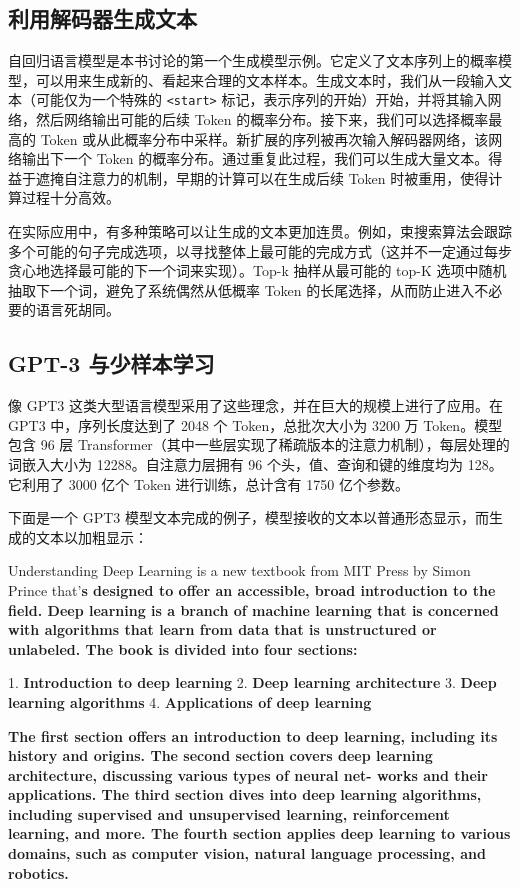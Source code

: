 \documentclass[lang=cn,newtx,10pt,scheme=chinese]{elegantbook}
\begin{document}
\subsection{利用解码器生成文本}
自回归语言模型是本书讨论的第一个生成模型示例。它定义了文本序列上的概率模型，可以用来生成新的、看起来合理的文本样本。生成文本时，我们从一段输入文本（可能仅为一个特殊的 \texttt{\textless start\textgreater} 标记，表示序列的开始）开始，并将其输入网络，然后网络输出可能的后续 Token 的概率分布。接下来，我们可以选择概率最高的 Token 或从此概率分布中采样。新扩展的序列被再次输入解码器网络，该网络输出下一个 Token 的概率分布。通过重复此过程，我们可以生成大量文本。得益于遮掩自注意力的机制，早期的计算可以在生成后续 Token 时被重用，使得计算过程十分高效。

在实际应用中，有多种策略可以让生成的文本更加连贯。例如，束搜索算法会跟踪多个可能的句子完成选项，以寻找整体上最可能的完成方式（这并不一定通过每步贪心地选择最可能的下一个词来实现）。Top-k 抽样从最可能的 top-K 选项中随机抽取下一个词，避免了系统偶然从低概率 Token 的长尾选择，从而防止进入不必要的语言死胡同。

\subsection{GPT-3 与少样本学习}
像 GPT3 这类大型语言模型采用了这些理念，并在巨大的规模上进行了应用。在 GPT3 中，序列长度达到了 2048 个 Token，总批次大小为 3200 万 Token。模型包含 96 层 Transformer（其中一些层实现了稀疏版本的注意力机制），每层处理的词嵌入大小为 12288。自注意力层拥有 96 个头，值、查询和键的维度均为 128。它利用了 3000 亿个 Token 进行训练，总计含有 1750 亿个参数。

下面是一个 GPT3 模型文本完成的例子，模型接收的文本以普通形态显示，而生成的文本以加粗显示：

Understanding Deep Learning is a new textbook from MIT Press by Simon Prince that’\textbf{s designed to offer an accessible, broad introduction to the field. Deep learning is a branch of machine learning that is concerned with algorithms that learn from data that is unstructured or unlabeled. The book is divided into four sections:}

1. \textbf{Introduction to deep learning} 
2. \textbf{Deep learning architecture}
3. \textbf{Deep learning algorithms}
4. \textbf{Applications of deep learning}

\textbf{The first section offers an introduction to deep learning, including its history and origins. The second section covers deep learning architecture, discussing various types of neural net- works and their applications. The third section dives into deep learning algorithms, including supervised and unsupervised learning, reinforcement learning, and more. The fourth section applies deep learning to various domains, such as computer vision, natural language processing, and robotics.}
\end{document}
